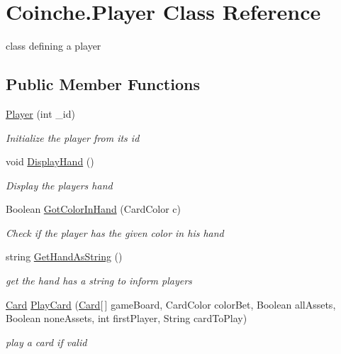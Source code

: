 \hypertarget{class_coinche_1_1_player}{}\section{Coinche.\+Player Class Reference}
\label{class_coinche_1_1_player}


class defining a player  


\subsection*{Public Member Functions}
\begin{DoxyCompactItemize}
\item 
\hyperlink{class_coinche_1_1_player_a2111dfa81103a51e186b77dd90b73c22}{Player} (int \+\_\+id)
\begin{DoxyCompactList}\small\item\em Initialize the player from its id \end{DoxyCompactList}\item 
void \hyperlink{class_coinche_1_1_player_afc5c66bf2caf32ea6a55fd2db27b6ae6}{Display\+Hand} ()
\begin{DoxyCompactList}\small\item\em Display the player\textquotesingle{}s hand \end{DoxyCompactList}\item 
Boolean \hyperlink{class_coinche_1_1_player_a20320a851740a462825fa0098a942834}{Got\+Color\+In\+Hand} (Card\+Color c)
\begin{DoxyCompactList}\small\item\em Check if the player has the given color in his hand \end{DoxyCompactList}\item 
string \hyperlink{class_coinche_1_1_player_a837c604aef1f5845a0728b7b53facc94}{Get\+Hand\+As\+String} ()
\begin{DoxyCompactList}\small\item\em get the hand has a string to inform players \end{DoxyCompactList}\item 
\hyperlink{class_coinche_1_1_card}{Card} \hyperlink{class_coinche_1_1_player_a3d79efe6f0971335edaaa2a0039aba00}{Play\+Card} (\hyperlink{class_coinche_1_1_card}{Card}\mbox{[}$\,$\mbox{]} game\+Board, Card\+Color color\+Bet, Boolean all\+Assets, Boolean none\+Assets, int first\+Player, String card\+To\+Play)
\begin{DoxyCompactList}\small\item\em play a card if valid \end{DoxyCompactList}\end{DoxyCompactItemize}
